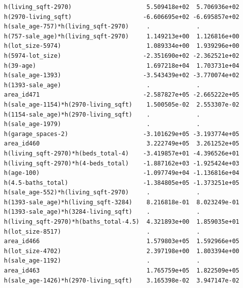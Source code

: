 \documentclass[
]{article}
\begin{document}
\begin{verbatim}
h(living_sqft-2970)                     5.509418e+02  5.706936e+02
h(2970-living_sqft)                    -6.606695e+02 -6.695857e+02
h(sale_age-757)*h(living_sqft-2970)     .             .           
h(757-sale_age)*h(living_sqft-2970)     1.149213e+00  1.126816e+00
h(lot_size-5974)                        1.089334e+00  1.939296e+00
h(5974-lot_size)                       -2.351690e+02 -2.362521e+02
h(39-age)                               1.697218e+04  1.703731e+04
h(sale_age-1393)                       -3.543439e+02 -3.770074e+02
h(1393-sale_age)                        .             .           
area_id471                             -2.587827e+05 -2.665222e+05
h(sale_age-1154)*h(2970-living_sqft)    1.500505e-02  2.553307e-02
h(1154-sale_age)*h(2970-living_sqft)    .             .           
h(sale_age-1979)                        .             .           
h(garage_spaces-2)                     -3.101629e+05 -3.193774e+05
area_id460                              3.222749e+05  3.261252e+05
h(living_sqft-2970)*h(beds_total-4)    -3.419857e+01 -4.396526e+01
h(living_sqft-2970)*h(4-beds_total)    -1.887162e+03 -1.925424e+03
h(age-100)                             -1.097749e+04 -1.136816e+04
h(4.5-baths_total)                     -1.384805e+05 -1.373251e+05
h(sale_age-552)*h(living_sqft-2970)     .             .           
h(1393-sale_age)*h(living_sqft-3284)    8.216818e-01  8.023249e-01
h(1393-sale_age)*h(3284-living_sqft)    .             .           
h(living_sqft-2970)*h(baths_total-4.5)  4.321893e+00  1.859035e+01
h(lot_size-8517)                        .             .           
area_id466                              1.579803e+05  1.592966e+05
h(lot_size-4702)                        2.397198e+00  1.803394e+00
h(sale_age-1192)                        .             .           
area_id463                              1.765759e+05  1.822509e+05
h(sale_age-1426)*h(2970-living_sqft)    3.165398e-02  3.947147e-02
                                                                  

\end{verbatim}
\end{document}
